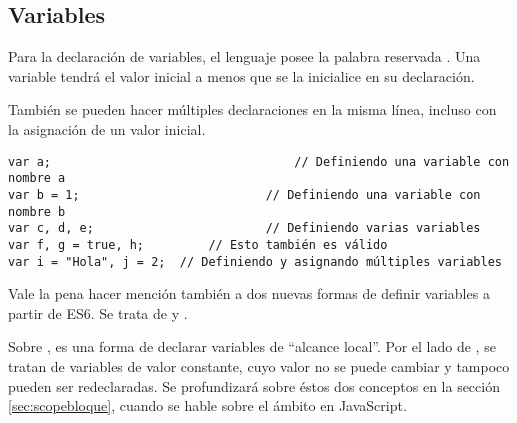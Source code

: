 \subsection{Variables}

Para la declaración de variables, el lenguaje posee la palabra reservada . Una variable tendrá el valor inicial  a menos que se la inicialice en su declaración.

También se pueden hacer múltiples declaraciones en la misma línea, incluso con la asignación de un valor inicial.

\begin{lstlisting}[title={Declarando variables}]
var a;									// Definiendo una variable con nombre a
var b = 1; 	 						// Definiendo una variable con nombre b
var c, d, e;	 					// Definiendo varias variables
var f, g = true, h;			// Esto también es válido
var i = "Hola", j = 2;	// Definiendo y asignando múltiples variables
\end{lstlisting}

Vale la pena hacer mención también a dos nuevas formas de definir variables a partir de ES6. Se trata de  y .

Sobre , es una forma de declarar variables de "`alcance local"'. Por el lado de , se tratan de variables de valor constante, cuyo valor no se puede cambiar y tampoco pueden ser redeclaradas. Se profundizará sobre éstos dos conceptos en la sección \ref{sec:scopebloque}, cuando se hable sobre el ámbito en JavaScript.
